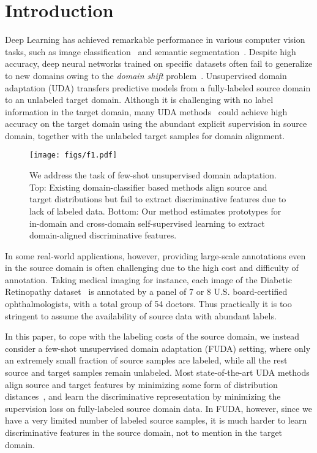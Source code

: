 \documentclass[final]{cvpr}
\begin{document}
\section{Introduction}
Deep Learning has achieved remarkable performance in various computer vision tasks, such as image classification~\cite{he2016deep, huang2017densely} and semantic segmentation~\cite{long2015fully, zhao2017pyramid, chen2017deeplab}. Despite high accuracy, deep neural networks trained on specific datasets often fail to generalize to new domains owing to the \textit{domain shift} problem~\cite{torralba2011unbiased,donahue2014decaf,tzeng2017adversarial}. Unsupervised domain adaptation (UDA) transfers  predictive models from a fully-labeled source domain to an unlabeled target domain. Although it is challenging with no label information in the target domain, many UDA methods~\cite{tzeng2017adversarial, hoffman2018cycada, long2015learning, ganin2016domain} could achieve high accuracy on the target domain using the abundant explicit supervision in source domain, together with the unlabeled target samples for domain alignment. 

\begin{figure}[t]
 \centering
 \texttt{[image: figs/f1.pdf]}
\caption{We address the task of few-shot unsupervised domain adaptation. Top: Existing domain-classifier based methods align source and target distributions but fail to extract discriminative features due to lack of labeled data. Bottom: Our method estimates prototypes for in-domain and cross-domain self-supervised learning to extract domain-aligned discriminative features. }
 \label{fig:teaser}
\end{figure}

In some real-world applications, however, providing large-scale annotations even in the source domain is often challenging due to the high cost and difficulty of annotation. Taking medical imaging for instance, each image of the Diabetic Retinopathy dataset~\cite{gulshan2016development} is annotated by a panel of 7 or 8 U.S. board-certified ophthalmologists, with a total group of 54 doctors. Thus practically it is too stringent to assume the availability of source data with abundant labels. 



In this paper, to cope with the labeling costs of the source domain, we instead consider a few-shot unsupervised domain adaptation (FUDA) setting, where only an extremely small fraction of source samples are labeled, while all the rest source and target samples remain unlabeled. Most state-of-the-art UDA methods align source and target features by minimizing some form of distribution distances~\cite{long2015learning, long2018conditional, sun2017correlation, ganin2016domain}, and learn the discriminative representation by minimizing the supervision loss on fully-labeled source domain data. In FUDA, however, since we have a very limited number of labeled source samples, it is much harder to learn discriminative features in the source domain, not to mention in the target domain. 
\end{document}
